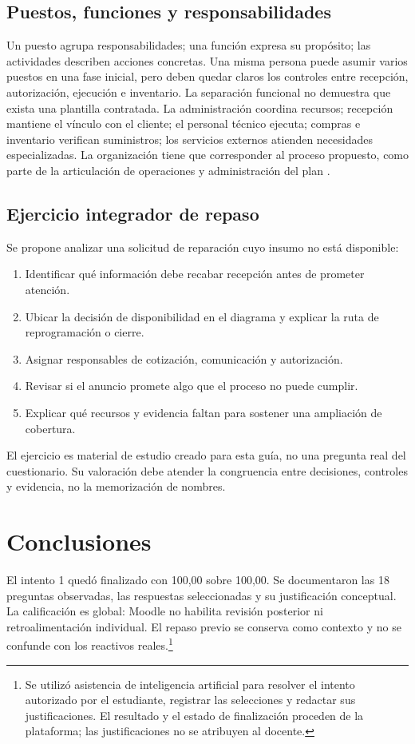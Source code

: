 {\subsection{Puestos, funciones y responsabilidades}
Un puesto agrupa responsabilidades; una función expresa su propósito; las actividades describen acciones concretas. Una misma persona puede asumir varios puestos en una fase inicial, pero deben quedar claros los controles entre recepción, autorización, ejecución e inventario. La separación funcional no demuestra que exista una plantilla contratada.
La administración coordina recursos; recepción mantiene el vínculo con el cliente; el personal técnico ejecuta; compras e inventario verifican suministros; los servicios externos atienden necesidades especializadas. La organización tiene que corresponder al proceso propuesto, como parte de la articulación de operaciones y administración del plan \citep{manualGuiaPlanNegocio}.
\subsection{Ejercicio integrador de repaso}
Se propone analizar una solicitud de reparación cuyo insumo no está disponible:
\begin{enumerate}
\item Identificar qué información debe recabar recepción antes de prometer atención.
\item Ubicar la decisión de disponibilidad en el diagrama y explicar la ruta de reprogramación o cierre.
\item Asignar responsables de cotización, comunicación y autorización.
\item Revisar si el anuncio promete algo que el proceso no puede cumplir.
\item Explicar qué recursos y evidencia faltan para sostener una ampliación de cobertura.
\end{enumerate}
El ejercicio es material de estudio creado para esta guía, no una pregunta real del cuestionario. Su valoración debe atender la congruencia entre decisiones, controles y evidencia, no la memorización de nombres.
\section{Conclusiones}
El intento 1 quedó finalizado con 100,00 sobre 100,00. Se documentaron las 18 preguntas observadas, las respuestas seleccionadas y su justificación conceptual. La calificación es global: Moodle no habilita revisión posterior ni retroalimentación individual. El repaso previo se conserva como contexto y no se confunde con los reactivos reales.\footnote{Se utilizó asistencia de inteligencia artificial para resolver el intento autorizado por el estudiante, registrar las selecciones y redactar sus justificaciones. El resultado y el estado de finalización proceden de la plataforma; las justificaciones no se atribuyen al docente.}
}

